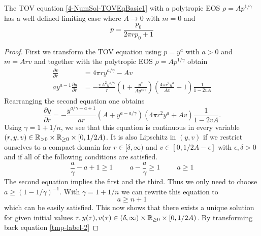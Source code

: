 \begin{theorem}
	The TOV equation \ref{4-NumSol-TOVEqBasic1} with a polytropic EOS $\rho=Ap^{1/\gamma}$ has a well defined limiting case where $A\rightarrow0$ with $m=0$ and
	\begin{equation}
		p = \frac{p_0}{2\pi rp_0+1}
	\end{equation}
\end{theorem}
\begin{proof}
	First we transform the TOV equation using $p=y^a$ with $a>0$ and $m=Arv$ and together with the polytropic EOS $\rho=Ap^{1/\gamma}$ obtain
	\begin{align}
		\frac{\partial v}{\partial r} &= 4\pi ry^{a/\gamma}-Av\\
		ay^{a-1}\frac{\partial y}{\partial r} &= -\frac{vA^2y^{a/\gamma}}{r}\left(1+\frac{y^a}{Ay^{a/\gamma}}\right)\left(\frac{4\pi r^2y^a}{Av} +1\right)\frac{1}{1-2vA}
		\label{tmp-label-2}
	\end{align}
	Rearranging the second equation one obtains
	\begin{equation}
		\frac{\partial y}{\partial r} = -\frac{y^{a/\gamma-a+1}}{ar}\left(A+y^{a-a/\gamma}\right)\left(4\pi r^2y^a +Av\right)\frac{1}{1-2vA}.
	\end{equation}
	Using $\gamma=1+1/n$, we see that this equation is continuous in every variable $(r,y,v)\in\mathbb{R}_{>0}\times\mathbb{R}_{\geq0}\times[0,1/2A)$. It is also Lipschitz in $(y,v)$ if we restrict 
	ourselves to a compact domain for $r\in[\delta,\infty)$ and $v\in[0,1/2A-\epsilon]$ with $\epsilon, \delta>0$ and if all of the following conditions are satisfied.
	\begin{equation}
		\frac{a}{\gamma}-a+1 \geq 1 \hspace{1cm} a-\frac{a}{\gamma} \geq 1 \hspace{1cm} a \geq 1
		\label{tmp-label-1}
	\end{equation}
	The second equation implies the first and the third. Thus we only need to choose $a\geq(1-1/\gamma)^{-1}$. With $\gamma=1+1/n$ we can rewrite this equation to 
	\begin{equation}
		a\geq n+1
	\end{equation}
	which can be easily satisfied. This now shows that there exists a unique solution for given initial values $\tau, y(\tau), v(\tau)\in(\delta,\infty)\times\mathbb{R}_{\geq0}\times[0,1/2A)$.
	By transforming back equation \ref{tmp-label-2}
	
\end{proof}
